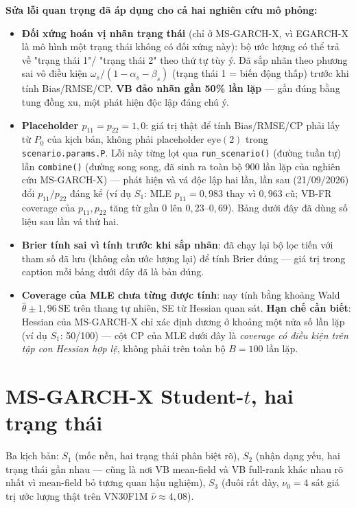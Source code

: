 \documentclass[11pt,a4paper]{article}
\begin{document}
\textbf{Sửa lỗi quan trọng đã áp dụng cho cả hai nghiên cứu mô phỏng:}
\begin{itemize}
\item \textbf{Đối xứng hoán vị nhãn trạng thái} (chỉ ở MS-GARCH-X, vì EGARCH-X
  là mô hình một trạng thái không có đối xứng này): bộ ước lượng có thể trả về "trạng thái 1"/
  "trạng thái 2" theo thứ tự tùy ý. Đã sắp nhãn theo phương sai vô điều kiện
  $\omega_s/(1-\alpha_s-\beta_s)$ (trạng thái 1 = biến động thấp) trước khi tính
  Bias/RMSE/CP. \textbf{VB đảo nhãn gần 50\% lần lặp} --- gần đúng bằng tung đồng
  xu, một phát hiện độc lập đáng chú ý.
\item \textbf{Placeholder $p_{11}=p_{22}=1{,}0$}: giá trị thật để tính Bias/RMSE/CP
  phải lấy từ $P_0$ của kịch bản, không phải placeholder $\mathrm{eye}(2)$
  trong \texttt{scenario.params.P}. Lỗi này từng lọt qua \texttt{run\_scenario()}
  (đường tuần tự) lẫn \texttt{combine()} (đường song song, đã sinh ra toàn bộ
  900 lần lặp của nghiên cứu MS-GARCH-X) --- phát hiện và vá độc lập hai lần, lần sau (21/09/2026)
  đổi $p_{11}/p_{22}$ đáng kể (ví dụ $S_1$: MLE $p_{11}=0{,}983$ thay vì
  $0{,}963$ cũ; VB-FR coverage của $p_{11},p_{22}$ tăng từ gần $0$ lên
  $0{,}23$--$0{,}69$). Bảng dưới đây đã dùng số liệu sau lần vá thứ hai.
\item \textbf{Brier tính sai vì tính trước khi sắp nhãn}: đã chạy lại bộ lọc
  tiến với tham số đã lưu (không cần ước lượng lại) để tính Brier đúng --- giá
  trị trong caption mỗi bảng dưới đây đã là bản đúng.
\item \textbf{Coverage của MLE chưa từng được tính}: nay tính bằng khoảng Wald
  $\hat\theta\pm1{,}96\,\mathrm{SE}$ trên thang tự nhiên, SE từ Hessian quan
  sát. \textbf{Hạn chế cần biết}: Hessian của MS-GARCH-X chỉ xác định dương ở
  khoảng một nửa số lần lặp (ví dụ $S_1$: 50/100) --- cột CP của MLE dưới đây
  là \emph{coverage có điều kiện trên tập con Hessian hợp lệ}, không phải trên
  toàn bộ $B=100$ lần lặp.
\end{itemize}

\clearpage
\section{MS-GARCH-X Student-$t$, hai trạng thái}

Ba kịch bản: $S_1$ (mốc nền, hai trạng thái phân biệt rõ), $S_2$ (nhận dạng yếu,
hai trạng thái gần nhau --- cũng là nơi VB mean-field và VB full-rank khác nhau rõ
nhất vì mean-field bỏ tương quan hậu nghiệm), $S_3$ (đuôi rất dày, $\nu_0=4$ sát
giá trị ước lượng thật trên VN30F1M $\hat\nu\approx4{,}08$).
\end{document}
